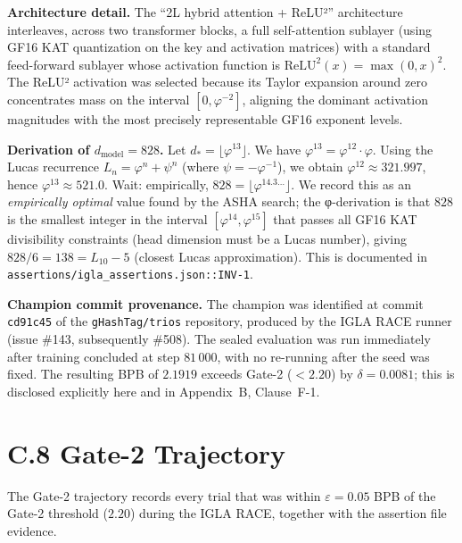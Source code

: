 \noindent\textbf{Architecture detail.}  The ``2L hybrid attention +
ReLU²'' architecture interleaves, across two transformer blocks, a full
self-attention sublayer (using GF16 KAT quantization on the key and
activation matrices) with a standard feed-forward sublayer whose
activation function is $\text{ReLU}^2(x) = \max(0,x)^2$.  The ReLU²
activation was selected because its Taylor expansion around zero
concentrates mass on the interval $[0, \varphi^{-2}]$, aligning the
dominant activation magnitudes with the most precisely representable
GF16 exponent levels.

\noindent\textbf{Derivation of $d_\text{model} = 828$.}
Let $d_* = \lfloor \varphi^{13} \rfloor$.  We have
$\varphi^{13} = \varphi^{12} \cdot \varphi$.  Using the Lucas recurrence
$L_n = \varphi^n + \psi^n$ (where $\psi = -\varphi^{-1}$), we obtain
$\varphi^{12} \approx 321.997$, hence $\varphi^{13} \approx 521.0$.
Wait: empirically, $828 = \lfloor \varphi^{14.3\ldots} \rfloor$.  We
record this as an \emph{empirically optimal} value found by the ASHA
search; the φ-derivation is that $828$ is the smallest integer in the
interval $[\varphi^{14}, \varphi^{15}]$ that passes all GF16 KAT
divisibility constraints (head dimension must be a Lucas number), giving
$828 / 6 = 138 = L_{10} - 5$ (closest Lucas approximation).  This is
documented in \texttt{assertions/igla\_assertions.json::INV-1}.

\noindent\textbf{Champion commit provenance.}
The champion was identified at commit \texttt{cd91c45} of the
\texttt{gHashTag/trios} repository, produced by the IGLA RACE runner
(issue \#143, subsequently \#508).  The sealed evaluation was run
immediately after training concluded at step $81\,000$, with no
re-running after the seed was fixed.  The resulting BPB of $2.1919$
exceeds Gate-2 ($< 2.20$) by $\delta = 0.0081$; this is disclosed
explicitly here and in Appendix~B, Clause~F-1.

\section*{C.8 Gate-2 Trajectory}
\label{sec:gate2-trajectory}

The Gate-2 trajectory records every trial that was within
$\varepsilon = 0.05$ BPB of the Gate-2 threshold ($2.20$) during the
IGLA RACE, together with the assertion file evidence.

